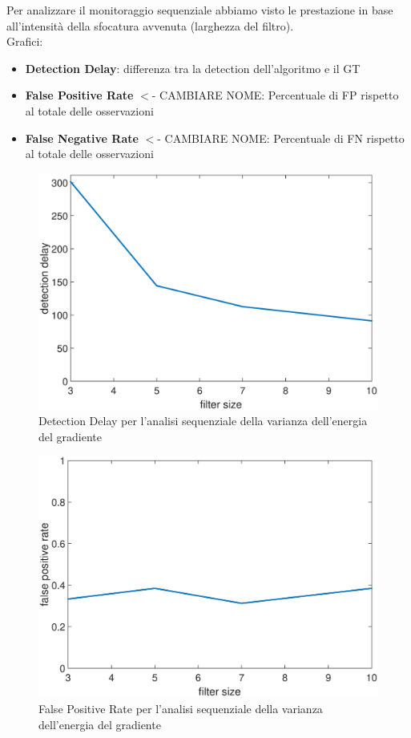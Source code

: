Per analizzare il monitoraggio sequenziale abbiamo visto le prestazione in base all'intensit\`a della sfocatura avvenuta (larghezza del filtro).\\
Grafici:
\begin{itemize}
	\item \textbf{Detection Delay}: differenza tra la detection dell'algoritmo e il GT
	\item \textbf{False Positive Rate} $<$- CAMBIARE NOME: Percentuale di FP rispetto al totale delle osservazioni
	\item \textbf{False Negative Rate} $<$- CAMBIARE NOME: Percentuale di FN rispetto al totale delle osservazioni
\end{itemize}
\begin{figure}[tb]
\centering
\includegraphics[width=13cm]{diagrammi/DD}
\caption{Detection Delay per l'analisi sequenziale della varianza dell'energia del gradiente}
\label{fig:DD}
\end{figure}
\begin{figure}[tb]
\centering
\includegraphics[width=13cm]{diagrammi/FPR}
\caption{False Positive Rate per l'analisi sequenziale della varianza dell'energia del gradiente}
\label{fig:FPR}
\end{figure}
